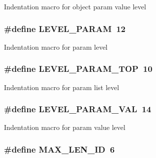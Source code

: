 Indentation macro for object param value level \hypertarget{group__LIBHELP_ga8fabc94f5bafb2197057a88deee01926}{
\subsubsection[{L\-E\-V\-E\-L\-\_\-\-P\-A\-R\-A\-M}]{\setlength{\rightskip}{0pt plus 5cm}\#define L\-E\-V\-E\-L\-\_\-\-P\-A\-R\-A\-M~12}}\label{group__LIBHELP_ga8fabc94f5bafb2197057a88deee01926}
Indentation macro for param level \hypertarget{group__LIBHELP_gac3f999a1a3235673b7babbfa1294afee}{
\subsubsection[{L\-E\-V\-E\-L\-\_\-\-P\-A\-R\-A\-M\-\_\-\-T\-O\-P}]{\setlength{\rightskip}{0pt plus 5cm}\#define L\-E\-V\-E\-L\-\_\-\-P\-A\-R\-A\-M\-\_\-\-T\-O\-P~10}}\label{group__LIBHELP_gac3f999a1a3235673b7babbfa1294afee}
Indentation macro for param list level \hypertarget{group__LIBHELP_gaae4f330d3207e58934ca25df51265f98}{
\subsubsection[{L\-E\-V\-E\-L\-\_\-\-P\-A\-R\-A\-M\-\_\-\-V\-A\-L}]{\setlength{\rightskip}{0pt plus 5cm}\#define L\-E\-V\-E\-L\-\_\-\-P\-A\-R\-A\-M\-\_\-\-V\-A\-L~14}}\label{group__LIBHELP_gaae4f330d3207e58934ca25df51265f98}
Indentation macro for param value level \hypertarget{group__LIBHELP_ga6f475315cf5d5278cdae2af64471ab80}{
\subsubsection[{M\-A\-X\-\_\-\-L\-E\-N\-\_\-\-I\-D}]{\setlength{\rightskip}{0pt plus 5cm}\#define M\-A\-X\-\_\-\-L\-E\-N\-\_\-\-I\-D~6}}\label{group__LIBHELP_ga6f475315cf5d5278cdae2af64471ab80}
